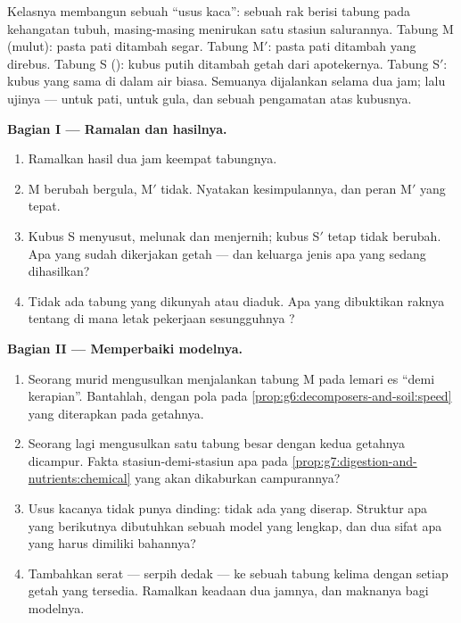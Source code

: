 \begin{problem}\label{pb:g7:digestion-and-nutrients:1}
Kelasnya membangun sebuah ``usus kaca'': sebuah rak berisi tabung pada
kehangatan tubuh, masing-masing menirukan satu stasiun salurannya.
Tabung M (mulut): pasta pati ditambah  segar. Tabung M$'$:
pasta pati ditambah  yang direbus. Tabung S (): kubus
putih  ditambah getah  dari apotekernya. Tabung S$'$:
kubus yang sama di dalam air biasa. Semuanya dijalankan selama dua
jam; lalu ujinya --- untuk pati, untuk gula, dan sebuah pengamatan
atas kubusnya.

\medskip\noindent\textbf{Bagian I --- Ramalan dan
hasilnya.}
\begin{enumerate}
  \item Ramalkan hasil dua jam keempat tabungnya.
  \item M berubah bergula, M$'$ tidak. Nyatakan kesimpulannya, dan
        peran M$'$ yang tepat.
  \item Kubus S menyusut, melunak dan menjernih; kubus S$'$ tetap
        tidak berubah. Apa yang sudah dikerjakan getah  ---
        dan keluarga  jenis apa yang sedang dihasilkan?
  \item Tidak ada tabung yang dikunyah atau diaduk. Apa yang
        dibuktikan raknya tentang di mana letak pekerjaan sesungguhnya
        ?
\end{enumerate}

\medskip\noindent\textbf{Bagian II --- Memperbaiki modelnya.}
\begin{enumerate}[resume]
  \item Seorang murid mengusulkan menjalankan tabung M pada 
        lemari es ``demi kerapian''. Bantahlah, dengan pola pada
        \cref{prop:g6:decomposers-and-soil:speed} yang diterapkan pada
        getahnya.
  \item Seorang lagi mengusulkan satu tabung besar dengan kedua
        getahnya dicampur. Fakta stasiun-demi-stasiun apa pada
        \cref{prop:g7:digestion-and-nutrients:chemical} yang akan
        dikaburkan campurannya?
  \item Usus kacanya tidak punya dinding: tidak ada yang diserap.
        Struktur apa yang berikutnya dibutuhkan sebuah model yang
        lengkap, dan dua sifat apa yang harus dimiliki bahannya?
  \item Tambahkan serat --- serpih dedak --- ke sebuah tabung kelima
        dengan setiap getah yang tersedia. Ramalkan keadaan dua
        jamnya, dan maknanya bagi modelnya.
\end{enumerate}


\end{problem}
